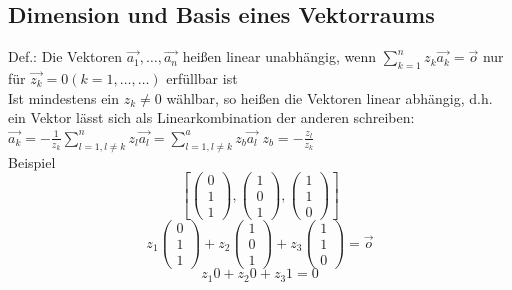 \documentclass{article}
\begin{document}
\subsection{Dimension und Basis eines Vektorraums}
Def.: Die Vektoren {$\vec{a_1},\dots,\vec{a_n}$} heißen linear unabhängig, wenn $\sum_{k=1}^{n} z_k \vec{a_k}=\vec{o}$ nur für $\vec{z_k} = 0 (k=1,\dots,\dots)$ erfüllbar ist\\
Ist mindestens ein $z_k \neq 0$ wählbar, so heißen die Vektoren linear abhängig, d.h. ein Vektor lässt sich als Linearkombination der anderen schreiben:\\
$\vec{a_k}=-\frac{1}{z_k}\sum_{l=1, l\neq k}^{n}z_l \vec{a_l} = \sum_{l=1,l\neq k}^{a}{z_b}\vec{a_l}$ \hspace*{1cm} $z_b=-\frac{z_l}{z_k}$\\
Beispiel
\begin{equation*}
    \left[\left(\begin{array}{c}
        0\\ 1\\ 1
    \end{array}\right),\left(\begin{array}{c}
        1\\ 0\\ 1
    \end{array}\right),\left(\begin{array}{c}
        1\\ 1\\ 0
    \end{array}\right)\right]
\end{equation*}
\begin{equation*}
    z_1\left(\begin{array}{c}
        0\\ 1\\ 1
    \end{array}\right)+z_2\left(\begin{array}{c}
        1\\ 0\\ 1
    \end{array}\right)+z_3\left(\begin{array}{c}
        1\\ 1\\ 0
    \end{array}\right) = \vec{o}
\end{equation*}
\begin{equation*}
    z_1 0+z_2 0 + z_3 1 = 0
\end{equation*}
\end{document}
